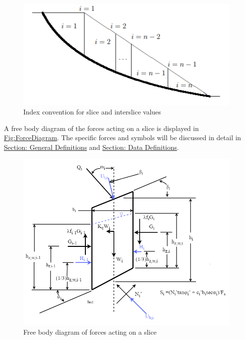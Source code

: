 \documentclass[12pt]{article}
\begin{document}
\begin{figure}
\begin{center}
\includegraphics[width=\textwidth]{../../../datafiles/SSP/IndexConvention.png}
\caption{Index convention for slice and interslice values}
\label{Figure:IndexConvention}
\end{center}
\end{figure}
A free body diagram of the forces acting on a slice is displayed in \hyperref[Figure:ForceDiagram]{Fig:ForceDiagram}. The specific forces and symbols will be discussed in detail in \hyperref[Sec:GDs]{Section: General Definitions} and \hyperref[Sec:DDs]{Section: Data Definitions}.

\begin{figure}
\begin{center}
\includegraphics[width=\textwidth]{../../../datafiles/SSP/ForceDiagram.png}
\caption{Free body diagram of forces acting on a slice}
\label{Figure:ForceDiagram}
\end{center}
\end{figure}
\end{document}
